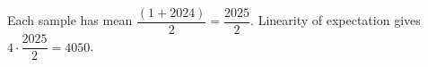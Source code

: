 Each sample has mean $\dfrac{(1+2024)}{2}=\dfrac{2025}{2}$. Linearity of expectation gives $4\cdot\dfrac{2025}{2}=\boxed{4050}$.
